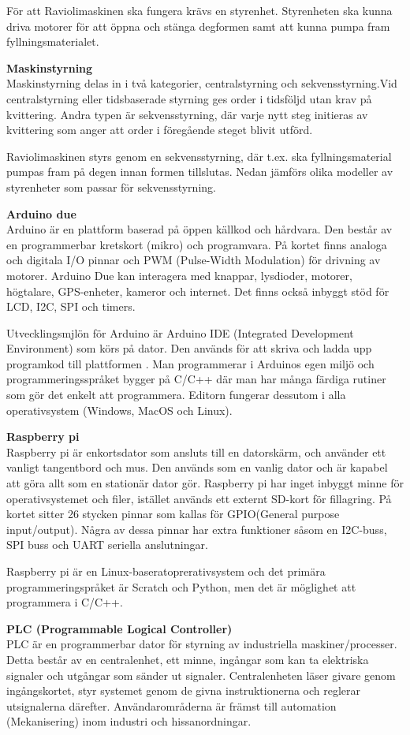 För att Raviolimaskinen ska fungera krävs en styrenhet. Styrenheten ska kunna driva motorer för att öppna och stänga degformen samt att kunna pumpa fram fyllningsmaterialet.

\textbf{Maskinstyrning}\\
Maskinstyrning delas in  i två kategorier, centralstyrning och sekvensstyrning.Vid centralstyrning eller tidsbaserade styrning ges order i tidsföljd utan krav på kvittering. Andra typen är sekvensstyrning, där varje nytt steg initieras av kvittering som anger  att order i föregående steget blivit utförd\cite{Maskinstyrning}.

Raviolimaskinen styrs genom en sekvensstyrning, där t.ex. ska fyllningsmaterial pumpas fram på degen innan formen tillslutas. Nedan jämförs olika modeller av styrenheter som passar för sekvensstyrning.

\textbf{Arduino due}\\
Arduino är en plattform baserad på öppen källkod och hårdvara. Den består av en  programmerbar kretskort (mikro) och programvara. På kortet finns analoga och digitala I/O pinnar och  PWM (Pulse-Width Modulation) för drivning av motorer. Arduino Due kan interagera med knappar, lysdioder, motorer, högtalare, GPS-enheter, kameror och internet. Det finns också inbyggt stöd för LCD, I2C, SPI och timers.

Utvecklingsmjlön för Arduino är Arduino IDE (Integrated Development Environment) som körs på  dator. Den används för att skriva och ladda upp programkod till plattformen \cite{Arduino1}. Man programmerar i Arduinos egen miljö och programmeringsspråket bygger på  C/C++ där man har många färdiga rutiner som gör det enkelt att programmera\cite{Arduino2}. Editorn fungerar dessutom i alla operativsystem (Windows, MacOS och Linux). 
 
\textbf{Raspberry pi}\\
Raspberry pi är enkortsdator som ansluts till en datorskärm, och använder ett vanligt tangentbord och mus. Den  används som en vanlig dator och  är kapabel att göra allt som en stationär dator gör. Raspberry pi har inget inbyggt minne för operativsystemet och filer, istället används ett externt SD-kort för fillagring. På kortet sitter 26 stycken pinnar som kallas för GPIO(General purpose input/output). Några av dessa pinnar har extra funktioner såsom en I2C-buss, SPI buss och UART seriella anslutningar\cite{Raspberry1}.

Raspberry pi är en Linux-baseratoprerativsystem och det primära programmeringspråket är Scratch och Python, men det är möglighet att programmera i C/C++.

\textbf{PLC (Programmable Logical Controller) }\\
PLC är en programmerbar dator för styrning av industriella maskiner/processer. Detta består av en centralenhet, ett minne, ingångar som kan ta elektriska signaler och utgångar som sänder ut signaler. Centralenheten läser givare genom ingångskortet, styr systemet genom de givna instruktionerna och reglerar utsignalerna därefter\cite{Programmable Logical Controller}. Användarområderna  är främst till automation (Mekanisering) inom industri och hissanordningar.
